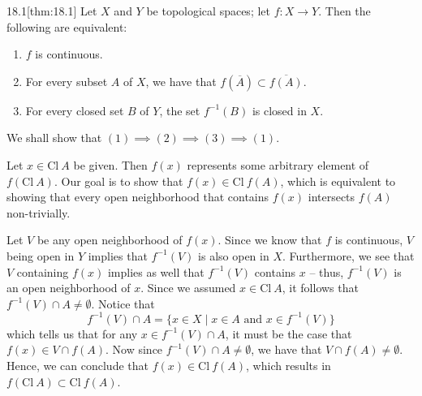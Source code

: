 \begin{thmBox}{18.1}[thm:18.1]
    Let \( X \) and \( Y \) be topological spaces; let \( f: X \rightarrow Y \).
    Then the following are equivalent:
    \begin{enumerate}
        \item \( f \) is continuous.
        \item For every subset \( A \) of \( X \), we have that 
            \( f ( \overline{ A } ) \subset \overline{ f ( A ) } \).
        \item For every closed set \( B \) of \( Y \), the set \( f^{ -1 } 
            ( B ) \) is closed in \( X \).
    \end{enumerate}

    \baseRule

    \begin{proofBox}
        We shall show that 
        \( ( 1 ) \implies ( 2 ) \implies ( 3 ) \implies ( 1 ) \).

        \baseSkip 


        Let \( x \in \mathrm{Cl} \ A \) be given.
        Then \( f ( x ) \) represents some arbitrary element of 
        \( f ( \mathrm{Cl} \ A ) \).
        Our goal is to show that \( f ( x ) \in \mathrm{Cl} \ f ( A ) \), which 
        is equivalent to showing that every open neighborhood that contains 
        \( f ( x ) \) intersects \( f ( A ) \) non-trivially.

        \baseSkip

        Let \( V \) be any open neighborhood of \( f ( x ) \).
        Since we know that \( f \) is continuous, \( V \) being open in \( Y \) 
        implies that \( f^{ -1 } ( V ) \) is also open in \( X \).
        Furthermore, we see that \( V \) containing \( f ( x ) \) implies as 
        well that \( f^{ -1 } ( V ) \) contains \( x \) -- thus, 
        \( f^{ -1 } ( V ) \) is an open neighborhood of \( x \).
        Since we assumed \( x \in \mathrm{Cl} \ A \), it follows that 
        \( f^{ -1 } ( V ) \cap A \neq \emptyset \).
        Notice that
        \begin{equation*}
            f^{ -1 } ( V ) \cap A
            =
            \{ x \in X \mid x \in A \text{ and } x \in f^{ -1 } ( V ) \}
        \end{equation*}
        which tells us that for any \( x \in f^{ -1 } ( V ) \cap A \), it must 
        be the case that \( f ( x ) \in V \cap f ( A ) \).
        Now since \( f^{ -1 } ( V ) \cap A \neq \emptyset \), we have that
        \( V \cap f ( A ) \neq \emptyset \).
        Hence, we can conclude that \( f ( x ) \in \mathrm{Cl} \ f ( A ) \),
        which results in \( f ( \mathrm{Cl} \ A ) \subset 
        \mathrm{Cl} \ f ( A ) \).


\end{proofBox}
\end{thmBox}
